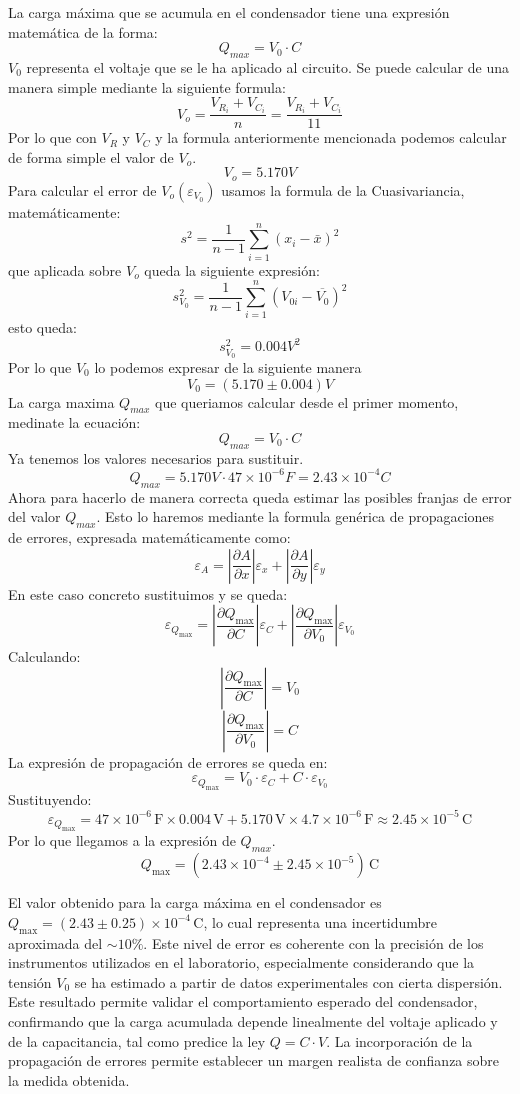 \documentclass{article}
\begin{document}
La carga máxima que se acumula en el condensador tiene una expresión matemática de la forma:
\[
Q_{max} = V_0 \cdot C
\]
$V_0$ representa el voltaje que se le ha aplicado al circuito. Se puede calcular de una manera simple mediante la siguiente formula:
\[
V_o = \frac{V_{R_i}+V_{C_i}}{n} = \frac{V_{R_i}+V_{C_i}}{11}
\]
Por lo que con $V_R$ y $V_C$ y la formula anteriormente mencionada podemos calcular de forma simple el valor de $V_o$.
\[
V_o = 5.170 V
\]
Para calcular el error de $V_o (\varepsilon_{V_0})$ usamos la formula de la Cuasivariancia, matemáticamente:
\[
s^2 = \frac{1}{n - 1} \sum_{i=1}^{n} (x_i - \bar{x})^2
\]
que aplicada sobre $V_o$ queda la siguiente expresión:
\[
s_{V_0}^2 = \frac{1}{n - 1} \sum_{i=1}^{n} \left( V_{0i} - \overline{V_0} \right)^2
\]
esto queda:
\[
s_{V_0}^2 = 0.004 V^2
\]
Por lo que $V_0$ lo podemos expresar de la siguiente manera
\[
V_0 = (5.170 \pm 0.004) V
\]
\vspace{2em}
La carga maxima $Q_{max}$ que queriamos calcular desde el primer momento, medinate la ecuación:
\[
Q_{max} = V_0 \cdot C
\]
Ya tenemos los valores necesarios para sustituir.
\[
Q_{max} = 5.170 V \cdot 47\times10^{-6} F = 2.43 \times 10 ^{-4} C
\]
Ahora para hacerlo de manera correcta queda estimar las posibles franjas de error del valor $Q_{max}$. Esto lo haremos mediante la formula genérica de propagaciones de errores, expresada matemáticamente como:
\[
\varepsilon_A = \left| \frac{\partial A}{\partial x} \right| \varepsilon_x + \left| \frac{\partial A}{\partial y} \right| \varepsilon_y
\]
En este caso concreto sustituimos y se queda:
\[
\varepsilon_{Q_{\text{max}}} = \left| \frac{\partial Q_{\text{max}}}{\partial C} \right| \varepsilon_C + \left| \frac{\partial Q_{\text{max}}}{\partial V_0} \right| \varepsilon_{V_0}
\]
Calculando:
\[
\left| \frac{\partial Q_{\text{max}}}{\partial C} \right| = V_0
\] 
\[
\left| \frac{\partial Q_{\text{max}}}{\partial V_0} \right| = C
\]
La expresión de propagación de errores se queda en:
\[
\varepsilon_{Q_{\text{max}}} = V_0 \cdot \varepsilon_C + C \cdot \varepsilon_{V_0}
\]
Sustituyendo:
\[
\varepsilon_{Q_{\text{max}}} = 47 \times 10^{-6} \, \text{F} \times 0.004 \, \text{V} + 5.170 \, \text{V} \times 4.7 \times 10^{-6} \, \text{F} \approx 2.45 \times 10^{-5} \, \text{C}
\]
Por lo que llegamos a la expresión de $Q_{max}$.
\[
Q_{\text{max}} = \left(2.43 \times 10^{-4} \pm 2.45 \times 10^{-5} \right) \, \text{C}
\]

El valor obtenido para la carga máxima en el condensador es 
\( Q_{\text{max}} = (2.43 \pm 0.25) \times 10^{-4} \, \text{C} \), 
lo cual representa una incertidumbre aproximada del \( \sim 10\% \). 
Este nivel de error es coherente con la precisión de los instrumentos utilizados en el laboratorio, especialmente considerando que la tensión \( V_0 \) se ha estimado a partir de datos experimentales con cierta dispersión. 
Este resultado permite validar el comportamiento esperado del condensador, confirmando que la carga acumulada depende linealmente del voltaje aplicado y de la capacitancia, tal como predice la ley \( Q = C \cdot V \). 
La incorporación de la propagación de errores permite establecer un margen realista de confianza sobre la medida obtenida.
\end{document}
